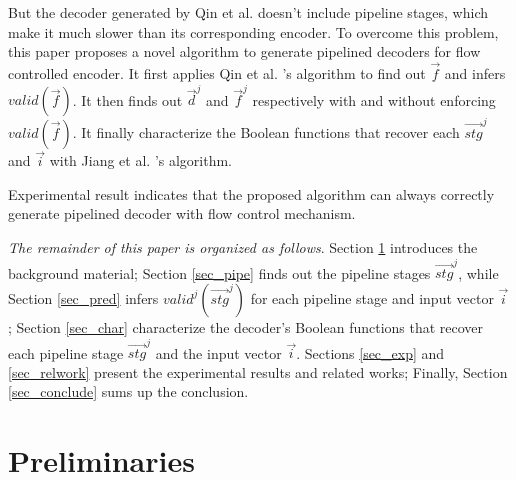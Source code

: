 \documentclass[runningheads,a4paper,orivec]{llncs}
\begin{document}
But the decoder generated by Qin et al. \cite{QinTODAES15} doesn't include pipeline stages,
which make it much slower than its corresponding encoder.
To overcome this problem,
this paper proposes a novel algorithm to generate pipelined decoders for flow controlled encoder.
It first applies Qin et al. \cite{QinTODAES15}'s algorithm to find out $\vec{f}$ and infers $valid(\vec{f})$.
It then finds out $\vec{d}^j$ and $\vec{f}^j$ respectively with and without enforcing $valid(\vec{f})$.
It finally characterize the Boolean functions that recover each $\vec{stg}^j$ and $\vec{i}$ with 
Jiang et al. \cite{InterpBoolFunction}'s algorithm.

Experimental result indicates that the proposed algorithm can always 
correctly generate pipelined decoder with flow control mechanism.

\emph{The remainder of this paper is organized as follows}.
Section \ref{sec_prem} introduces the background material;
Section \ref{sec_pipe} finds out the pipeline stages $\vec{stg}^j$,
while Section \ref{sec_pred} infers  $valid^j(\vec{stg}^j)$ for each pipeline stage and input vector $\vec{i}$;
Section \ref{sec_char} characterize the decoder's Boolean functions that recover each pipeline stage $\vec{stg}^j$ and the input vector $\vec{i}$.
Sections \ref{sec_exp} and \ref{sec_relwork} present the experimental results and related works;
Finally,
Section \ref{sec_conclude} sums up the conclusion.

\section{Preliminaries}\label{sec_prem}

\end{document}
